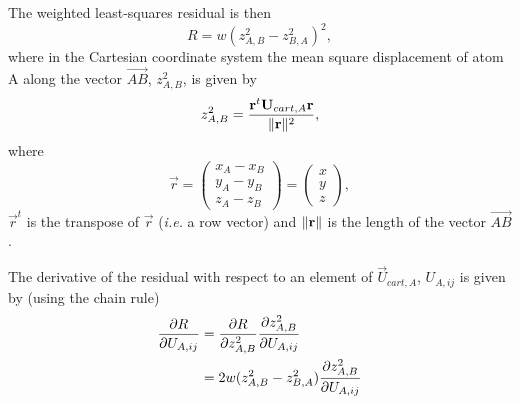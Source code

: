 \documentclass[11pt]{article}
\begin{document}
The weighted least-squares residual is then
\begin{equation}
R = w(z^2_{A,B} - z^2_{B,A})^2,
\end{equation}
where in the Cartesian coordinate system the mean square displacement of atom A
along the vector $\overrightarrow{AB}$, $z^2_{A,B}$, is given by
\begin{equation}
z^2_{A,B} = \frac{\mathbf{r}^t\mathbf{U}_{cart,A}\mathbf{r}}{\| \mathbf{r} \|^2},
\end{equation}
where
\begin{equation}
\vec{r} = \begin{pmatrix} x_A - x_B\\y_A - y_B\\z_A - z_B \end{pmatrix}
= \begin{pmatrix} x\\y\\z \end{pmatrix},
\end{equation}
$\vec{r}^t$ is the transpose of $\vec{r}$ (\textit{i.e.} a row vector) and
$\| \mathbf{r} \|$ is the length of the vector $\overrightarrow{AB}$.

The derivative of the residual with respect to an element of $\vec{U}_{cart,A}$,
$U_{A,ij}$ is given by (using the chain rule)
\begin{align}
\frac{\partial R}{\partial U_{A,ij}} &= \frac{\partial R}{\partial z^2_{A,B}} \frac{\partial z^2_{A,B}}{\partial U_{A,ij}}\\
&=2w(z^2_{A,B} - z^2_{B,A}) \frac{\partial z^2_{A,B}}{\partial U_{A,ij}}\label{eqn:r_derivative}
\end{align}
\end{document}
